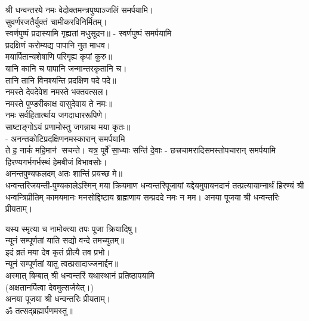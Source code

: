 श्री धन्वन्तरये नमः वेदोक्तमन्त्रपुष्पाञ्जलिं समर्पयामि।\\

सुवर्णरजतैर्युक्तं चामीकरविनिर्मितम्।\\
स्वर्णपुष्पं प्रदास्यामि गृह्यतां मधुसूदन॥ - स्वर्णपुष्पं समर्पयामि\\
 
प्रदक्षिणं करोम्यद्य पापानि नुत माधव।\\
मयार्पितान्यशेषाणि परिगृह्य कृपां कुरु॥\\
 यानि कानि च पापानि जन्मान्तरकृतानि च।\\
तानि तानि विनश्यन्ति प्रदक्षिण पदे पदे॥\\
 
नमस्ते देवदेवेश नमस्ते भक्तवत्सल।\\
नमस्ते पुण्डरीकाक्ष वासुदेवाय ते नमः॥\\
नमः सर्वहितार्त्थाय जगदाधाररूपिणे।\\
साष्टाङ्गोऽयं प्रणामोस्तु जगन्नाथ मया कृतः॥\\
- अनन्तकोटिप्रदक्षिणनमस्कारान् समर्पयामि\\

{ते ह॒ नाकं॑ महि॒मान॑ सचन्ते। यत्र॒ पूर्वे॑ सा॒ध्याः सन्ति॑ दे॒वाः}
- छत्त्रचामरादिसमस्तोपचारान् समर्पयामि\\

हिरण्यगर्भगर्भस्थं हेमबीजं विभावसोः।\\
अनन्तपुण्यफलदम् अतः शान्तिं प्रयच्छ मे॥\\

धन्वन्तरिजयन्ती-पुण्यकालेऽस्मिन् मया क्रियमाण धन्वन्तरिपूजायां यद्देयमुपायनदानं तत्प्रत्यायाम्नार्थं
हिरण्यं श्री धन्वन्त्रिप्रीतिम् 
कामयमानः मनसोद्दिष्टाय ब्राह्मणाय सम्प्रददे नमः न मम। 
अनया पूजया श्री धन्वन्तरिः प्रीयताम्। 
 
 यस्य स्मृत्या च नामोक्त्या तपः पूजा क्रियादिषु।\\
न्यूनं सम्पूर्णतां याति सद्यो वन्दे तमच्युतम्॥ \\
इदं व्रतं मया देव कृतं प्रीत्यै तव प्रभो।\\
न्यूनं सम्पूर्णतां यातु त्वत्प्रसादाज्जनार्द्दन॥\\
 
अस्मात् बिम्बात् श्री धन्वन्तरिं यथास्थानं प्रतिष्ठापयामि\\
(अक्षतानर्पित्वा देवमुत्सर्जयेत्।)\\
अनया पूजया श्री धन्वन्तरिः प्रीयताम्। \\
ॐ तत्सद्ब्रह्मार्पणमस्तु॥